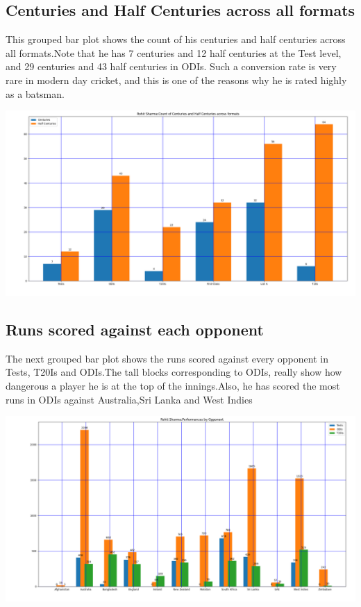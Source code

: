 \documentclass[twoside,10pt,a4paper]{article}
\numberwithin{equation}{section}
\numberwithin{figure}{section}
\begin{document}
\subsection{Centuries and Half Centuries across all formats}
This grouped bar plot shows the count of his centuries and half centuries across all formats.Note that he has 7 centuries and 12 half centuries at the Test level, and 29 centuries and 43 half centuries in ODIs. Such a conversion rate is very rare in modern day cricket, and this is one of the reasons why he is rated highly as a batsman.
\begin{center}
    \includegraphics[scale=0.25]{100s50s.png}
\end{center}
\subsection{Runs scored against each opponent}
The next grouped bar plot shows the runs scored against every opponent in Tests, T20Is and ODIs.The tall blocks corresponding to ODIs, really show how dangerous a player he is at the top of the innings.Also, he has scored the most runs in ODIs against Australia,Sri Lanka and West Indies
\begin{center}
    \includegraphics[scale=0.23]{Performance_opponent.png}
\end{center}
\end{document}
